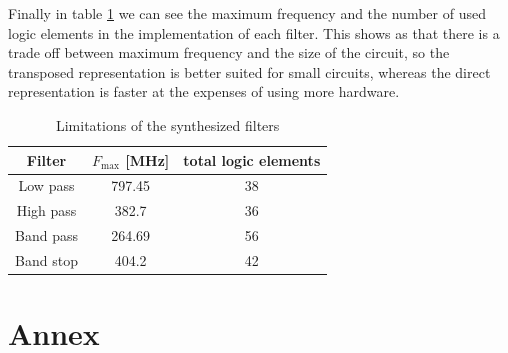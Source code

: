 \documentclass[12pt]{article}   	%
\begin{document}
Finally in table \ref{tab:fir_sinth} we can see the maximum frequency and the number of used logic elements in the implementation of each filter. This shows as that there is a trade off between maximum frequency and the size of the circuit, so the transposed representation is better suited for small circuits, whereas the direct representation is faster at the expenses of using more hardware.

\begin{table}[htbp]
	\centering
	\begin{tabular}{|c|c|c|}
		\hline
		 Filter & $F_\text{max}$ [MHz] & total logic elements \\
		\hline
		Low pass & 797.45 &38  \\
		\hline
		High pass & 382.7 &  36\\
		\hline
		Band pass &264.69  &  56\\
		\hline
		Band stop &404.2  & 42\\
		\hline
	\end{tabular}
	\caption{Limitations of the synthesized filters}
	\label{tab:fir_sinth}
\end{table}

\newpage

\printbibliography

\newpage

\section*{Annex}












\end{document}
